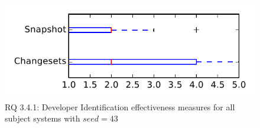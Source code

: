 
\begin{figure}
\centering
\includegraphics[height=0.4\textheight]{figures/dit_seed/rq1_tiny_43}
\caption{RQ 3.4.1: Developer Identification effectiveness measures for all subject systems with $seed=43$}
\label{fig:dit_seed:rq1:tiny}
\end{figure}

